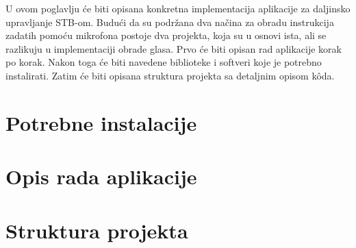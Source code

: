 \documentclass[../TamaraIvanovicMasterRad.tex]{subfiles}
\begin{document}
U ovom poglavlju će biti opisana konkretna implementacija aplikacije za daljinsko upravljanje STB-om. Budući da su podržana dva načina za obradu instrukcija zadatih pomoću mikrofona postoje dva projekta, koja su u osnovi ista, ali se razlikuju u implementaciji obrade glasa. Prvo će biti opisan rad aplikacije korak po korak. Nakon toga će biti navedene biblioteke i softveri koje je potrebno instalirati. Zatim će biti opisana struktura projekta sa detaljnim opisom k\^{o}da.

\section{Potrebne instalacije}

\section{Opis rada aplikacije}




\section{Struktura projekta}


\end{document}
